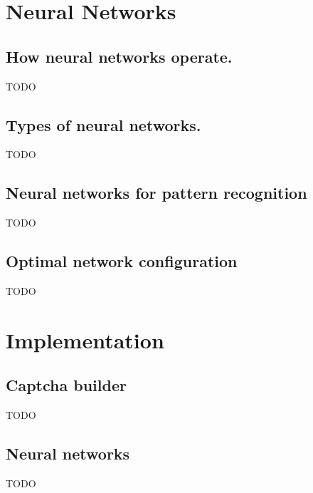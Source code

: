 \documentclass[pdftex,a4paper,12pt,twoside]{report}
\begin{document}
\section{Neural Networks}
\label{sec:neuralnetworks}
\subsection{How neural networks operate.}
TODO
\subsection{Types of neural networks.}
TODO
\subsection{Neural networks for pattern recognition}
TODO
\subsection{Optimal network configuration}
TODO
\section{Implementation}
\label{sec:implementation}
\subsection{Captcha builder}
TODO
\subsection{Neural networks}
TODO
\end{document}
